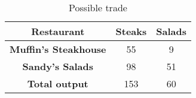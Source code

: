 \begin{table}
    \begin{tabular}{|c|c|c|}
      \hline
      \textbf{Restaurant} & \textbf{Steaks} & \textbf{Salads} \\
      \hline
      \textbf{Muffin's Steakhouse} & 55 & 9 \\
      \hline
      \textbf{Sandy's Salads} & 98 & 51 \\
      \hline
      \textbf{Total output} & 153 & 60 \\
      \hline
    \end{tabular}
    \caption{Possible trade}
  \end{table}
